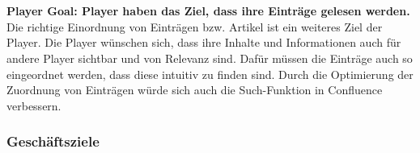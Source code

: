 \documentclass[a4paper,12pt]{scrartcl}
\begin{document}
\\\\
\textbf{Player Goal: Player haben das Ziel, dass ihre Einträge gelesen werden.}\\
Die richtige Einordnung von Einträgen bzw. Artikel ist ein weiteres Ziel der Player. Die Player wünschen sich, dass ihre Inhalte und Informationen auch für andere Player sichtbar und von Relevanz sind. Dafür müssen die Einträge auch so eingeordnet werden, dass diese intuitiv zu finden sind. Durch die Optimierung der Zuordnung von Einträgen würde sich auch die Such-Funktion in Confluence verbessern. 
 
\subsubsection{Geschäftsziele}
\label{Geschäftsziele}







 























  
\newpage
\listoftables
\listoffigures
\newpage

\end{document}
